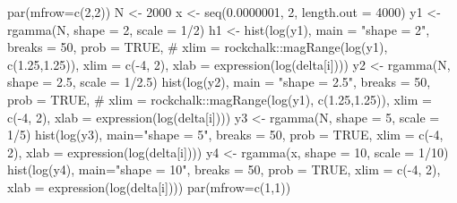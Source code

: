 \begin{Schunk}
\begin{Sinput}
 par(mfrow=c(2,2))
 N <- 2000
 x <- seq(0.0000001, 2, length.out = 4000)
 y1 <- rgamma(N, shape = 2, scale = 1/2)
 h1 <- hist(log(y1), main = "shape = 2", breaks = 50, prob = TRUE,
        #     xlim = rockchalk::magRange(log(y1), c(1.25,1.25)),
             xlim = c(-4, 2), 
             xlab = expression(log(delta[i])))
 y2 <- rgamma(N, shape = 2.5, scale = 1/2.5)
 hist(log(y2), main = "shape = 2.5", breaks = 50, prob = TRUE,
       # xlim = rockchalk::magRange(log(y1), c(1.25,1.25)),
       xlim = c(-4, 2), 
       xlab = expression(log(delta[i])))
 y3 <- rgamma(N, shape = 5, scale = 1/5)
 hist(log(y3), main="shape = 5", breaks = 50, prob = TRUE,
       xlim = c(-4, 2), 
       xlab = expression(log(delta[i])))
 y4 <- rgamma(x, shape = 10, scale = 1/10)
 hist(log(y4), main="shape = 10", breaks = 50, prob = TRUE,
       xlim = c(-4, 2), 
       xlab = expression(log(delta[i])))
 par(mfrow=c(1,1))
\end{Sinput}
\end{Schunk}

